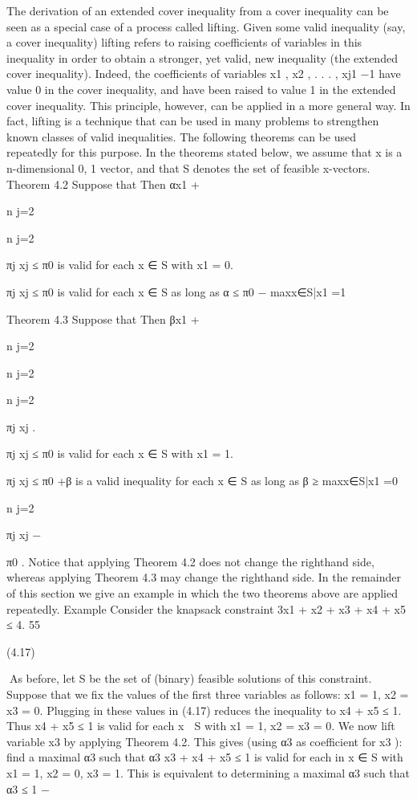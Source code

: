 \documentclass[titlepage]{book}
\theoremstyle{plain}
\theoremstyle{definition}
\theoremstyle{remark}
\begin{document}
The derivation of an extended cover inequality from a cover inequality can be seen as a special case
of a process called lifting. Given some valid inequality (say, a cover inequality) lifting refers to raising
coefficients of variables in this inequality in order to obtain a stronger, yet valid, new inequality (the
extended cover inequality). Indeed, the coefficients of variables x1 , x2 , . . . , xj1 −1 have value 0 in the cover
inequality, and have been raised to value 1 in the extended cover inequality. This principle, however, can
be applied in a more general way. In fact, lifting is a technique that can be used in many problems to
strengthen known classes of valid inequalities. The following theorems can be used repeatedly for this
purpose. In the theorems stated below, we assume that x is a n-dimensional {0, 1} vector, and that S
denotes the set of feasible x-vectors.
Theorem 4.2 Suppose that
Then αx1 +

n
j=2

n
j=2

πj xj ≤ π0 is valid for each x ∈ S with x1 = 0.

πj xj ≤ π0 is valid for each x ∈ S as long as α ≤ π0 − maxx∈S|x1 =1

Theorem 4.3 Suppose that
Then βx1 +

n
j=2

n
j=2

n
j=2

πj xj .

πj xj ≤ π0 is valid for each x ∈ S with x1 = 1.

πj xj ≤ π0 +β is a valid inequality for each x ∈ S as long as β ≥ maxx∈S|x1 =0

n
j=2

πj xj −

π0 .
Notice that applying Theorem 4.2 does not change the righthand side, whereas applying Theorem 4.3
may change the righthand side. In the remainder of this section we give an example in which the two
theorems above are applied repeatedly.
Example Consider the knapsack constraint
3x1 + x2 + x3 + x4 + x5 ≤ 4.
55

(4.17)

As before, let S be the set of (binary) feasible solutions of this constraint. Suppose that we fix the values
of the first three variables as follows:
x1 = 1, x2 = x3 = 0.
Plugging in these values in (4.17) reduces the inequality to x4 + x5 ≤ 1. Thus x4 + x5 ≤ 1 is valid for
each x ∈ S with x1 = 1, x2 = x3 = 0.
We now lift variable x3 by applying Theorem 4.2. This gives (using α3 as coefficient for x3 ): find a
maximal α3 such that α3 x3 + x4 + x5 ≤ 1 is valid for each in x ∈ S with x1 = 1, x2 = 0, x3 = 1. This is
equivalent to determining a maximal α3 such that
α3 ≤ 1 −
\end{document}
